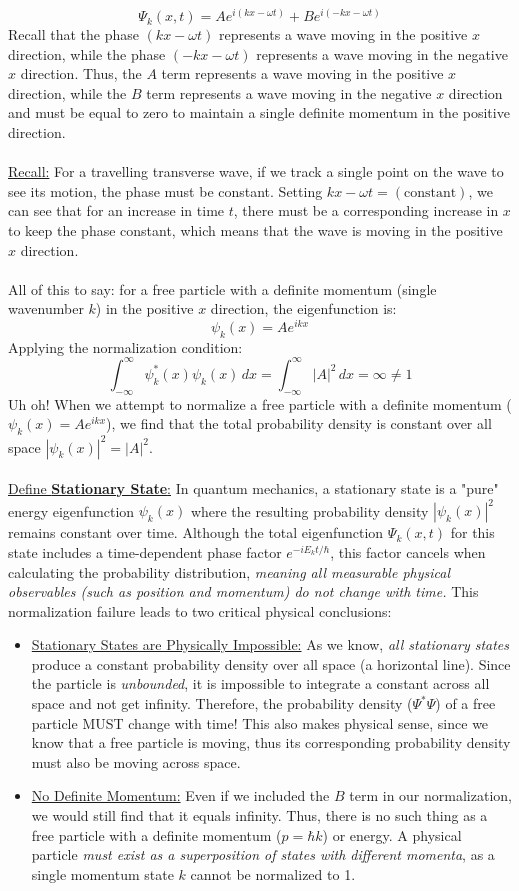 \documentclass[12pt]{article}
\begin{document}
$$\Psi_k(x,t) = Ae^{i(kx - \omega t)} + Be^{i(-kx - \omega t)}$$
Recall that the phase $(kx - \omega t)$ represents a wave moving in the positive $x$ direction, while the phase $(-kx - \omega t)$ represents a wave moving in the negative $x$ direction. Thus, the $A$ term represents a wave moving in the positive $x$ direction, while the $B$ term represents a wave moving in the negative $x$ direction and must be equal to zero to maintain a single definite momentum in the positive direction.\\\\
\underline{Recall:} For a travelling transverse wave, if we track a single point on the wave to see its motion, the phase must be constant. Setting $kx - \omega t = (\text{constant})$, we can see that for an increase in time $t$, there must be a corresponding increase in $x$ to keep the phase constant, which means that the wave is moving in the positive $x$ direction.\\\\
All of this to say: for a free particle with a definite momentum (single wavenumber $k$) in the positive $x$ direction, the eigenfunction is:
\[\psi_k(x) = A e^{ik x}\]
Applying the normalization condition:
\[\int_{-\infty}^{\infty} \psi_k^*(x) \psi_k(x)\, dx = \int_{-\infty}^{\infty} |A|^2\,dx = \infty \neq 1\]
Uh oh! When we attempt to normalize a free particle with a definite momentum ($\psi_k(x) = Ae^{ikx}$), we find that the total probability density is constant over all space $|\psi_k(x)|^2 = |A|^2$.\\\\
\underline{Define \textbf{Stationary State}:} In quantum mechanics, a stationary state is a "pure" energy eigenfunction $\psi_k(x)$ where the resulting probability density $|\psi_k(x)|^2$ remains constant over time. Although the total eigenfunction $\Psi_k(x,t)$ for this state includes a time-dependent phase factor $e^{-iE_k t/\hbar}$, this factor cancels when calculating the probability distribution, \textit{meaning all measurable physical observables (such as position and momentum) do not change with time.}
\newpage\noindent
This normalization failure leads to two critical physical conclusions:
\begin{itemize}
\item \underline{Stationary States are Physically Impossible:} As we know, \textit{all stationary states} produce a constant probability density over all space (a horizontal line). Since the particle is \textit{unbounded}, it is impossible to integrate a constant across all space and not get infinity. Therefore, the probability density ($\Psi^*\Psi$) of a free particle MUST change with time! This also makes physical sense, since we know that a free particle is moving, thus its corresponding probability density must also be moving across space.
\item \underline{No Definite Momentum:} Even if we included the $B$ term in our normalization, we would still find that it equals infinity. Thus, there is no such thing as a free particle with a definite momentum ($p=\hbar k$) or energy. A physical particle \textit{must exist as a superposition of states with different momenta}, as a single momentum state $k$ cannot be normalized to 1.
\end{itemize}
\end{document}
